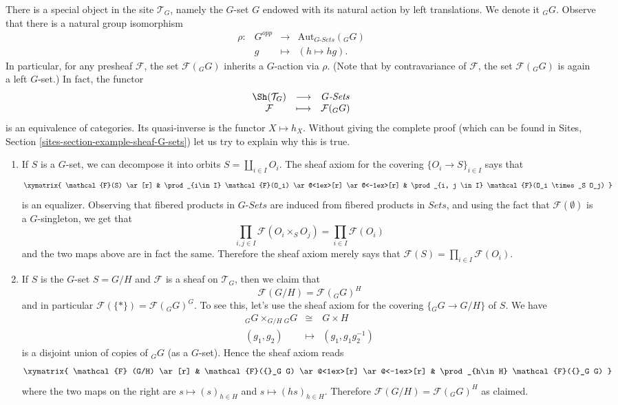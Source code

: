 \medskip\noindent
There is a special object in the site $\mathcal{T}_G$, namely the $G$-set $G$
endowed with its natural action by left translations. We denote it ${}_G G$.
Observe that there is a natural group isomorphism
$$
\begin{matrix}
\rho : & G^{opp} & \longrightarrow & \text{Aut}_{G\textit{-Sets}}({}_G G) \\
& g & \longmapsto & (h \mapsto hg).
\end{matrix}
$$
In particular, for any presheaf $\mathcal{F}$, the set $\mathcal{F}({}_G G)$
inherits a $G$-action via $\rho$. (Note that by contravariance of
$\mathcal{F}$, the set $\mathcal{F}({}_G G)$ is again a left $G$-set.) In fact,
the functor
$$
\begin{matrix}
\Sh(\mathcal{T}_G) & \longrightarrow & G\textit{-Sets} \\
\mathcal{F} & \longmapsto & \mathcal{F}({}_G G)
\end{matrix}
$$
is an equivalence of categories. Its quasi-inverse is the functor $X \mapsto
h_X$. Without giving the complete proof (which can be found in
Sites, Section \ref{sites-section-example-sheaf-G-sets})
let us try to explain why this is true.
\begin{enumerate}
\item
If $S$ is a $G$-set, we can decompose it into orbits $S = \coprod_{i\in I}
O_i$. The sheaf axiom for the covering $\{O_i \to S\}_{i\in I}$ says that
$$
\xymatrix{
\mathcal{F}(S) \ar[r] &
\prod_{i\in I} \mathcal{F}(O_i) \ar@<1ex>[r] \ar@<-1ex>[r] &
\prod_{i, j \in I} \mathcal{F}(O_i \times_S O_j)
}
$$
is an equalizer. Observing that fibered products in $G\textit{-Sets}$ are
induced from fibered products in $\textit{Sets}$, and using the fact that
$\mathcal{F}(\emptyset)$ is a $G$-singleton, we get that
$$
\prod_{i, j \in I} \mathcal{F}(O_i \times_S O_j) = \prod_{i \in I}
\mathcal{F}(O_i)
$$
and the two maps above are in fact the same. Therefore the sheaf axiom merely
says that $\mathcal{F}(S) = \prod_{i\in I} \mathcal{F}(O_i)$.
\item
If $S$ is the $G$-set $S= G/H$ and $\mathcal{F}$ is a sheaf on $\mathcal{T}_G$,
then we claim that
$$
\mathcal{F}(G/H) = \mathcal{F}({}_G G)^H
$$
and in particular $\mathcal{F}(\{*\}) = \mathcal{F}({}_G G)^G$. To see this,
let's use the sheaf axiom for the covering $\{ {}_G G \to G/H \}$ of $S$. We
have
\begin{eqnarray*}
{}_G G \times_{G/H} {}_G G & \cong & G \times H \\
(g_1, g_2) & \longmapsto & (g_1, g_1 g_2^{-1})
\end{eqnarray*}
is a disjoint union of copies of ${}_G G$ (as a $G$-set). Hence the sheaf axiom
reads
$$
\xymatrix{
\mathcal{F} (G/H) \ar[r] &
\mathcal{F}({}_G G) \ar@<1ex>[r] \ar@<-1ex>[r] &
\prod_{h\in H} \mathcal{F}({}_G G)
}
$$
where the two maps on the right are $s \mapsto (s)_{h \in H}$ and $s \mapsto
(hs)_{h \in H}$. Therefore $\mathcal{F}(G/H) = \mathcal{F}({}_G G)^H$ as
claimed.
\end{enumerate}

